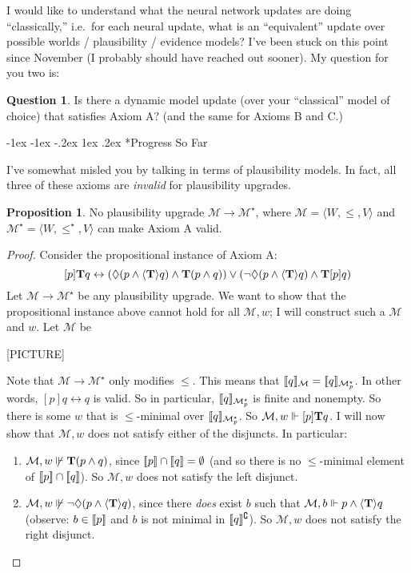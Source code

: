 \documentclass[letterpaper]{article}
\makeatletter
\theoremstyle{definition}
\newtheorem{proposition}{Proposition}
\newtheorem*{question}{Question}
\newcounter{section}
\newcommand\section{\@startsection {section}{1}{\z@}%
                                   {-1ex \@plus -1ex \@minus -.2ex}%
                                   {1ex \@plus.2ex}%
                                   {\normalfont\large\bfseries}}
\newcommand{\semantics}[1]{[\![\mbox{\em $ #1 $\/}]\!]}
\newcommand{\Model}{\mathcal{M}}
\newcommand{\Typ}[1]{\textrm{\textup{\textbf{T}}} #1}
\newcommand{\Update}[1]{[#1]}
\newcommand{\diaTyp}[1]{\langle \textrm{\textup{\textbf{T}}} \rangle #1}
\makeatother
\begin{document}
I would like to understand what the neural network updates are doing ``classically,'' i.e.\ for each neural update, what is an ``equivalent'' update over possible worlds / plausibility / evidence models?  I've been stuck on this point since November (I probably should have reached out sooner).  My question for you two is:
\begin{question}
    Is there a dynamic model update (over your ``classical'' model of choice) that satisfies Axiom A? (and the same for Axioms B and C.)
\end{question}

\section*{Progress So Far}

I've somewhat misled you by talking in terms of plausibility models.  In fact, all three of these axioms are \emph{invalid} for plausibility upgrades.

\begin{proposition}
    No plausibility upgrade $\Model \to \Model^\star$,  where $\Model = \langle W, \leq, V \rangle$ and $\Model^\star = \langle W, \leq^\star, V \rangle$ can make Axiom A valid.
\end{proposition}
\begin{proof}
    Consider the propositional instance of Axiom A:
    \[
        \Update{p} \Typ{q} \leftrightarrow 
        (\Diamond(p \land \diaTyp{q}) \land \Typ{(p \land q)}) \lor (\neg \Diamond(p \land \diaTyp{q}) \land \Typ{\Update{p} q})
    \]
    Let $\Model \to \Model^\star$ be any plausibility upgrade.  We want to show that the propositional instance above cannot hold for all $\Model, w$; I will construct such a $\Model$ and $w$.  Let $\Model$ be
    
    [PICTURE]

    Note that $\Model \to \Model^\star$ only modifies $\leq$.  This means that $\semantics{q}_\Model = \semantics{q}_{\Model^\star_p}$.  In other words, $\Update{p} q \leftrightarrow q$ is valid.  So in particular, $\semantics{q}_{\Model^\star_p}$ is finite and nonempty.  So there is some $w$ that is ${\leq}$-minimal over $\semantics{q}_{\Model^\star_p}$.  So $\Model, w \Vdash \Update{p} \Typ{q}$.  I will now show that $\Model, w$ does not satisfy either of the disjuncts.  In particular:
    \begin{enumerate}
        \item $\Model, w \not \Vdash \Typ{(p \land q)}$, since $\semantics{p} \cap \semantics{q} = \emptyset$ (and so there is no ${\leq}$-minimal element of $\semantics{p} \cap \semantics{q}$).  So $\Model, w$ does not satisfy the left disjunct.
        
        \item $\Model, w \not \Vdash \neg\Diamond(p \land \diaTyp{q})$, since there \emph{does} exist $b$ such that $\Model, b \Vdash p \land \diaTyp{q}$ (observe: $b \in \semantics{p}$ and $b$ is not minimal in $\semantics{q}^\complement$).  So $\Model, w$ does not satisfy the right disjunct.\qedhere
    \end{enumerate}
\end{proof}
\end{document}
